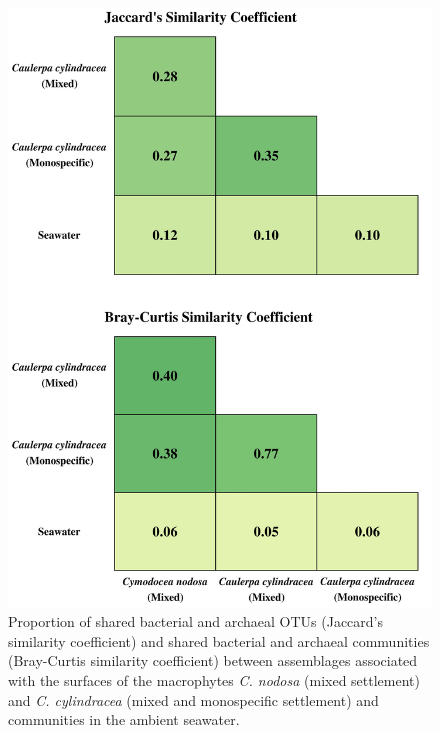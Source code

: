 \documentclass[12pt,]{article}
\begin{document}
\begin{figure}[H]

{\centering \includegraphics[width=0.7\linewidth]{../results/figures/matrix} 

}

\caption{Proportion of shared bacterial and archaeal OTUs (Jaccard's similarity coefficient) and shared bacterial and archaeal communities (Bray-Curtis similarity coefficient) between assemblages associated with the surfaces of the macrophytes \textit{C. nodosa} (mixed settlement) and \textit{C. cylindracea} (mixed and monospecific settlement) and communities in the ambient seawater.\label{matrix}}\label{fig:unnamed-chunk-1}
\end{figure}
\end{document}
